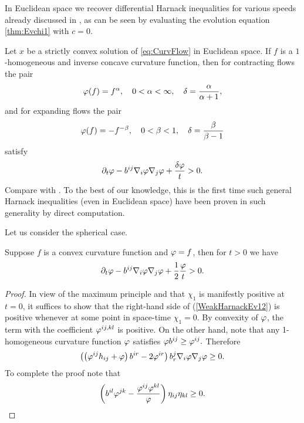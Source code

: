 \documentclass{amsart}
\begin{document}
In Euclidean space we recover differential Harnack inequalities for various speeds already discussed in \cite[Cor.~5.11 (1)]{MR1296393}, as can be seen by evaluating the evolution equation \eqref{thm:Evchi1} with $c=0.$
\begin{remark}\label{HarnackEucCor}
 Let $x$ be a strictly convex solution of \eqref{eq:CurvFlow} in Euclidean space. If $f$ is a $1$-homogeneous and inverse concave curvature function, then for contracting flows the pair
$$\varphi(f)=f^{\alpha},\quad 0<\alpha<\infty, \quad \delta= \frac{\alpha}{\alpha+1},$$
and for expanding flows the pair
$$\varphi(f)=-f^{-\beta}, \quad 0<\beta<1,\quad \delta= \frac{\beta}{\beta-1}$$
satisfy $$\partial_t \varphi-b^{ij}\nabla_i\varphi\nabla_j\varphi+\frac{\delta\varphi}{t}>0.$$
Compare with \cite[Theorem 5.6, Corollary 5.11]{MR1296393}. To the best of our knowledge, this is the first time such general Harnack inequalities (even in Euclidean space) have been proven in such generality by direct computation.
\end{remark}
Let us consider the spherical case.
\begin{theorem}\label{thm: main A}
Suppose $f$ is a  convex curvature function and $\varphi=f$, then for $t>0$ we have
$$\partial_t \varphi-b^{ij}\nabla_i\varphi\nabla_j\varphi+\frac{1}{2}\frac{\varphi}{t}>0.$$
\end{theorem}
\begin{proof}
In view of the maximum principle and that $\chi_1$ is manifestly positive at $t=0$, it suffices to show that the right-hand side of (\ref{WeakHarnackEv12}) is positive whenever at some point in space-time $\chi_1=0$. By convexity of $\varphi$, the term with the coefficient $\varphi^{ij,kl}$ is positive. On the other hand, note that any 1-homogeneous curvature function $\varphi$ satisfies $\varphi b^{ij}\geq \varphi^{ij}.$ Therefore
$$\left(\left(\varphi^{ij}h_{ij}+\varphi\right)b^{ir}-2\varphi^{ir}\right)b^{j}_{r}\nabla_{i}\varphi\nabla_{j}\varphi\ge 0.$$ To complete the proof note that
$$\left(b^{il}\varphi^{jk}-\frac{\varphi^{ij}\varphi^{kl}}{\varphi}\right)\eta_{ij}\eta_{kl}\geq 0.$$
\end{proof}
\end{document}
